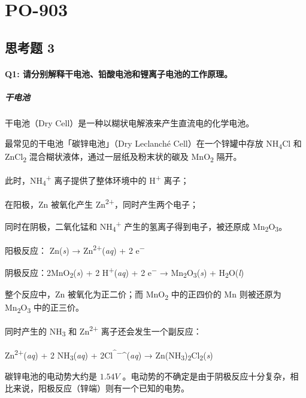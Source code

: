 \documentclass[
]{article}
\date{}
\begin{document}
\hypertarget{header-n0}{%
\section{PO-903}\label{header-n0}}

\hypertarget{header-n2}{%
\subsection{思考题 3}\label{header-n2}}

\hypertarget{header-n4}{%
\paragraph{Q1:
请分别解释干电池、铅酸电池和锂离子电池的工作原理。}\label{header-n4}}

\hypertarget{header-n11}{%
\subparagraph{干电池}\label{header-n11}}

干电池（Dry Cell）是一种以糊状电解液来产生直流电的化学电池。

最常见的干电池「碳锌电池」（Dry Leclanché Cell）在一个锌罐中存放
NH\textsubscript{4}Cl 和 ZnCl\textsubscript{2}
混合糊状液体，通过一层纸及粉末状的碳及 MnO\textsubscript{2} 隔开。

此时，NH\textsubscript{4}\textsuperscript{+} 离子提供了整体环境中的
H\textsuperscript{+} 离子；

在阳极，Zn 被氧化产生 Zn\textsuperscript{2+}，同时产生两个电子；

同时在阴极，二氧化锰和 NH\textsubscript{4}\textsuperscript{+}
产生的氢离子得到电子，被还原成 Mn\textsubscript{2}O\textsubscript{3}。

阳极反应： Zn(\emph{s}) → Zn\textsuperscript{2+}(\emph{aq}) + 2
e\textsuperscript{−}

阴极反应：2MnO\textsubscript{2}(\emph{s}) + 2
H\textsuperscript{+}(\emph{aq}) + 2 e\textsuperscript{−} →
Mn\textsubscript{2}O\textsubscript{3}(\emph{s}) +
H\textsubscript{2}O(\emph{l})

整个反应中，Zn 被氧化为正二价；而 MnO\textsubscript{2} 中的正四价的 Mn
则被还原为 Mn\textsubscript{2}O\textsubscript{3} 中的正三价。

同时产生的 NH\textsubscript{3} 和 Zn\textsuperscript{2+}
离子还会发生一个副反应：

Zn\textsuperscript{2+}(\emph{aq}) + 2 NH\textsubscript{3}(\emph{aq}) +
2Cl\textsuperscript{\^{}−}\^{}(\emph{aq}) →
Zn(NH\textsubscript{3})\textsubscript{2}Cl\textsubscript{2}(\emph{s})

碳锌电池的电动势大约是 \(1.54V\)
。电动势的不确定是由于阴极反应十分复杂，相比来说，阳极反应（锌端）则有一个已知的电势。
\end{document}
